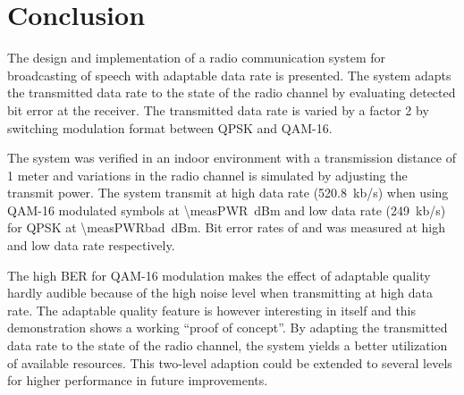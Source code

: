 \section{Conclusion}
\label{sec:conclusion}
The design and implementation of a radio communication system for broadcasting of speech with adaptable data rate is presented. The system adapts the transmitted data rate to the state of the radio channel by evaluating detected bit error at the receiver. The transmitted data rate is varied by a factor 2 by switching modulation format between QPSK and QAM-16. 

The system was verified in an indoor environment with a transmission distance of 1 meter and variations in the radio channel is simulated by adjusting the transmit power. The system transmit at high data rate (\SI{520,8}{kb/s}) when using QAM-16 modulated symbols at \SI{\measPWR}{dBm} and low data rate (\SI{249}{kb/s}) for QPSK at \SI{\measPWRbad}{dBm}. Bit error rates of \measBERQAMGood and \measBERQPSKBad was measured at high and low data rate respectively.

The high BER for QAM-16 modulation makes the effect of adaptable quality hardly audible because of the high noise level when transmitting at high data rate. The adaptable quality feature is however interesting in itself and this demonstration shows a working ``proof of concept''. By adapting the transmitted data rate to the state of the radio channel, the system yields a better utilization of available resources. This two-level adaption could be extended to several levels for higher performance in future improvements.